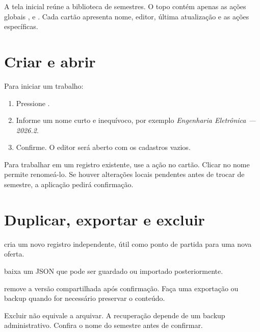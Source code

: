 A tela inicial reúne a biblioteca de semestres. O topo contém apenas as ações globais ,  e . Cada cartão apresenta nome, editor, última atualização e as ações específicas.


\section{Criar e abrir}

Para iniciar um trabalho:

\begin{enumerate}
  \item Pressione .
  \item Informe um nome curto e inequívoco, por exemplo \emph{Engenharia Eletrônica --- 2026.2}.
  \item Confirme. O editor será aberto com os cadastros vazios.
\end{enumerate}


Para trabalhar em um registro existente, use a ação  no cartão. Clicar no nome permite renomeá-lo. Se houver alterações locais pendentes antes de trocar de semestre, a aplicação pedirá confirmação.

\section{Duplicar, exportar e excluir}

\begin{description}[style=nextline,leftmargin=0pt]
  \item[Duplicar semestre] cria um novo registro independente, útil como ponto de partida para uma nova oferta.
  \item[Exportar semestre] baixa um JSON que pode ser guardado ou importado posteriormente.
  \item[Excluir semestre] remove a versão compartilhada após confirmação. Faça uma exportação ou backup quando for necessário preservar o conteúdo.
\end{description}

\begin{dangerbox}
Excluir não equivale a arquivar. A recuperação depende de um backup administrativo. Confira o nome do semestre antes de confirmar.
\end{dangerbox}

